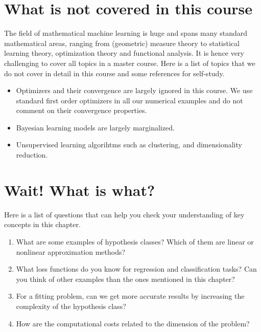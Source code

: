 \section*{What is not covered in this course}
The field of mathematical machine learning is huge and spans many standard
mathematical areas, ranging from (geometric) measure theory to statistical
learning theory, optimization theory and functional analysis. It is hence very
challenging to cover all topics in a master course. Here is a list of topics
that we do not cover in detail in this course and some references for
self-study. 

\begin{itemize}
    \item Optimizers and their convergence are largely ignored in this course.
    We use standard first order optimizers in all our numerical examples and do
    not comment on their convergence properties. 
    \item Bayesian learning models are largely marginalized.
    \item Unsupervised learning algorihtms such as clustering, and
    dimensionality reduction.
\end{itemize}


\section*{Wait! What is what?}
Here is a list of questions that can help you check your understanding of key
concepts in this chapter.

\begin{enumerate}
    \item What are some examples of hypothesis classes? Which of them are
    linear or nonlinear approximation methods?
    \item What loss functions do you know for regression and classification
    tasks? Can you think of other examples than the ones mentioned in this
    chapter?
    \item For a fitting problem, can we get more accurate results by increasing
    the complexity of the hypothesis class?
    \item How are the computational costs related to the dimension of the
    problem? 
\end{enumerate}

